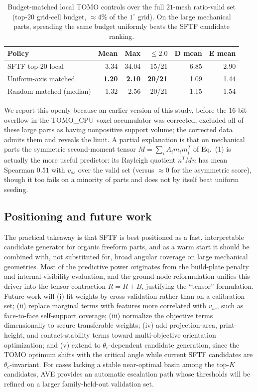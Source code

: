 \documentclass[12pt]{article}
\begin{document}
\begin{table}[H]
\centering
\caption{Budget-matched local TOMO controls over the full $21$-mesh ratio-valid set
(top-$20$ grid-cell budget, $\approx 4\%$ of the $1^\circ$ grid). On the large
mechanical parts, spreading the same budget uniformly beats the SFTF candidate ranking.}
\label{tab:budget-matched-g5}
\small
\begin{tabular}{lrrrrr}
\toprule
Policy & Mean & Max & $\le 2.0$ & D mean & E mean\\
\midrule
SFTF top-$20$ local & 3.34 & 34.04 & 15/21 & 6.85 & 2.90\\
Uniform-axis matched & \textbf{1.20} & \textbf{2.10} & \textbf{20/21} & 1.09 & 1.44\\
Random matched (median) & 1.32 & 2.56 & 20/21 & 1.15 & 1.54\\
\bottomrule
\end{tabular}
\end{table}

We report this openly because an earlier version of this study, before the $16$-bit
overflow in the TOMO\_CPU voxel accumulator was corrected, excluded all of these large
parts as having nonpositive support volume; the corrected data admits them and reveals
the limit. A partial explanation is that on mechanical parts the symmetric
second-moment tensor $M=\sum_i A_i m_i m_i^T$ of Eq.~(1) is actually the more useful
predictor: its Rayleigh quotient $n^{T}Mn$ has mean Spearman $0.51$ with $v_{ss}$ over
the valid set (versus $\approx 0$ for the asymmetric score), though it too fails on a
minority of parts and does not by itself beat uniform seeding.

\subsection{Positioning and future work}
The practical takeaway is that SFTF is best positioned as a fast, interpretable
candidate generator for organic freeform parts, and as a warm start it should be
combined with, not substituted for, broad angular coverage on large mechanical
geometries. Most of the predictive power originates from the build-plate penalty and
internal-visibility evaluation, and the ground-node reformulation unifies this driver
into the tensor contraction $\tilde R=R+B$, justifying the ``tensor'' formulation.
Future work will (i) fit weights by cross-validation rather than on a calibration set;
(ii) replace marginal terms with features more correlated with $v_{ss}$, such as
face-to-face self-support coverage; (iii) normalize the objective terms dimensionally
to secure transferable weights; (iv) add projection-area, print-height, and
contact-stability terms toward multi-objective orientation optimization; and (v)
extend to $\theta_c$-dependent candidate generation, since the TOMO optimum shifts with
the critical angle while current SFTF candidates are $\theta_c$-invariant. For cases
lacking a stable near-optimal basin among the top-$K$ candidates, AVE provides an
automatic escalation path whose thresholds will be refined on a larger
family-held-out validation set.
\end{document}
